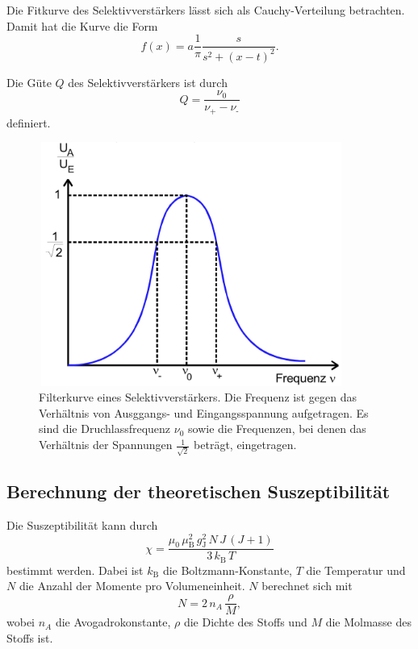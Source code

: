 \noindent Die Fitkurve des Selektivverstärkers lässt sich als Cauchy-Verteilung \cite{cauchy} betrachten. Damit hat die Kurve die Form 
\begin{equation}
    f(x) = a \frac{1}{\pi} \frac{s}{s^2 + (x-t)^2}.
    \label{cauchyverteilung}
\end{equation}

\noindent Die Güte $Q$ des Selektivverstärkers ist durch
\begin{equation}
    Q = \frac{\nu_0}{\nu_\text{+} - \nu_\text{-}}
    \label{eqn:guete}
\end{equation}
definiert.

\begin{figure}
    \centering
    \includegraphics[width=10cm, height=8cm]{build/filterkurve.png}
    \caption{Filterkurve eines Selektivverstärkers. Die Frequenz ist gegen das
    Verhältnis von Ausggangs- und Eingangsspannung aufgetragen. Es sind die
    Druchlassfrequenz $\nu_0$ sowie die Frequenzen, bei denen das Verhältnis der
    Spannungen $\frac{1}{\sqrt{2}}$ beträgt, eingetragen. \cite{V606}}
    \label{abb:filterkurve}
\end{figure}


\subsection{Berechnung der theoretischen Suszeptibilität}
Die Suszeptibilität kann durch 
\begin{equation}
    \chi = \frac{\mu_0 \, \mu_\text{B}^2 \, g_\text{J}^2 \, N \, J \, (J+1)}{3 \, k_\text{B} \, T}
    \label{eqn:chitheo}
\end{equation}
bestimmt werden.
Dabei ist $k_\text{B}$ die Boltzmann-Konstante, $T$ die Temperatur und $N$ die Anzahl der 
Momente pro Volumeneinheit.
$N$ berechnet sich mit 
\begin{equation}
    N = 2 \, n_A \, \frac{\rho}{M},
    \label{N}
\end{equation}
wobei $n_A$ die Avogadrokonstante, $\rho$ die Dichte des Stoffs und $M$ die Molmasse des Stoffs ist. 

